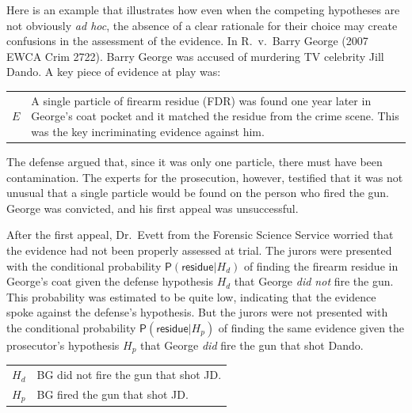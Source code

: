 \documentclass[10pt,dvipsnames,enabledeprecatedfontcommands]{scrartcl}
\newcommand{\pr}[1]{\mathsf{P}(#1)}
\begin{document}
Here is an example that illustrates how even when the competing
hypotheses are not obviously \textit{ad hoc}, the absence of a clear
rationale for their choice may create confusions in the assessment of
the evidence. In R.~v.~Barry George (2007 EWCA Crim 2722). Barry George
was accused of murdering TV celebrity Jill Dando. A key piece of
evidence at play was: \vspace{2mm}

\begin{center}
\begin{tabular}{lp{12cm}} 
    $E$ &  
    A single particle of firearm  residue (FDR) 
     was found one year later in George's coat pocket and it matched the residue from the crime scene.
     This was the key incriminating evidence against him. 
\end{tabular}
\end{center}
\vspace{2mm}

\noindent  The defense argued that, since it was only one particle,
there must have been contamination. The experts for the prosecution,
however, testified that it was not unusual that a single particle would
be found on the person who fired the gun. George was convicted, and his
first appeal was unsuccessful.

After the first appeal, Dr.~Evett from the Forensic Science Service
worried that the evidence had not been properly assessed at trial. The
jurors were presented with the conditional probability
\(\pr{\textsf{residue}\vert H_d}\) of finding the firearm residue in
George's coat given the defense hypothesis \(H_d\) that George
\textit{did not} fire the gun. This probability was estimated to be
quite low, indicating that the evidence spoke against the defense's
hypothesis. But the jurors were not presented with the conditional
probability \(\pr{\textsf{residue}\vert H_p}\) of finding the same
evidence given the prosecutor's hypothesis \(H_p\) that George
\textit{did} fire the gun that shot Dando. \vspace{2mm}

\begin{center}
    \begin{tabular}{lp{12cm}} 
$H_d$ & BG did not fire the gun that shot JD.\\
$H_p$ & BG fired the gun that shot JD.
\end{tabular}
\end{center}
\vspace{2mm}
\end{document}
